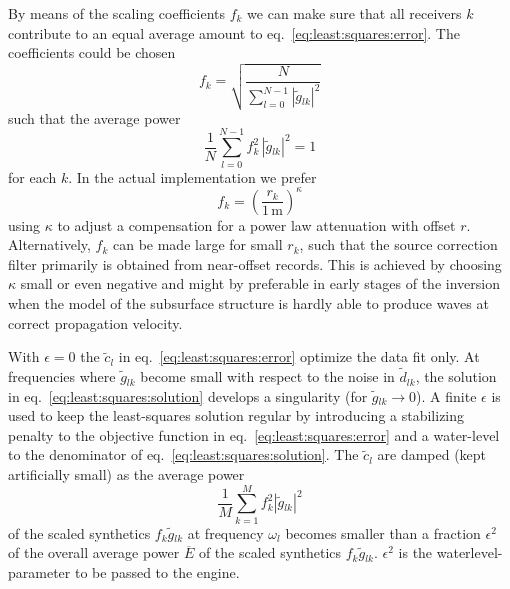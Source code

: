 \documentclass{article}
\newcommand{\Fourier}[1]{\ensuremath{\tilde{#1}}}
\newcommand{\Fd}{\ensuremath{\Fourier{d}}}
\newcommand{\Fs}{\ensuremath{\Fourier{g}}}
\newcommand{\Fq}{\ensuremath{\Fourier{c}}}
\newcommand{\So}{\ensuremath{\omega}}
\newcommand{\Sf}{\ensuremath{f}}
\newcommand{\Sr}{\ensuremath{r}}
\newcommand{\Ssk}{\ensuremath{\sum\limits_{k=1}^{M}}}
\newcommand{\SslN}{\ensuremath{\sum\limits_{l=0}^{N-1}}}
\newcommand{\Silk}{\ensuremath{_{lk}}}
\newcommand{\SmE}{\ensuremath{\overline{E}}}
\newcommand{\Se}{\ensuremath{\epsilon}}
\begin{document}
By means of the
scaling coefficients $\Sf_k$ we can make sure that all receivers
$k$ contribute to an equal average amount to
eq.~\eqref{eq:least:squares:error}.
The coefficients could be chosen
\begin{equation}
\Sf_k=\sqrt{\frac{N}{\SslN\left|\Fs\Silk\right|^2}}
\end{equation}
such that the average power
\begin{equation}
\frac{1}{N}\SslN\Sf^2_k\,\left|\Fs\Silk\right|^2=1
\end{equation}
for each $k$.
In the actual implementation we prefer
\begin{equation}
\Sf_k=\left(\frac{\Sr_k}{1\,\text{m}}\right)^\kappa
\end{equation}
using $\kappa$ to adjust a compensation for a power law attenuation with
offset $\Sr$.
Alternatively, $\Sf_k$ can be made large for small $\Sr_k$, such that the
source correction filter primarily is obtained from near-offset records.
This is achieved by choosing $\kappa$ small or even negative and
might by preferable in early stages of the inversion when the model of
the subsurface structure is hardly able to produce waves at correct
propagation velocity.

With $\Se=0$ the $\Fq_l$ in eq.~\eqref{eq:least:squares:error} optimize the
data fit only.
At frequencies where $\Fs\Silk$ become small with respect to the noise in 
$\Fd\Silk$, the solution in eq.~\eqref{eq:least:squares:solution} develops a
singularity (for $\Fs\Silk\rightarrow0$).
A finite $\Se$ is used to keep the least-squares solution regular
by introducing a stabilizing penalty to the objective function in
eq.~\eqref{eq:least:squares:error} and
a water-level to the denominator of eq.~\eqref{eq:least:squares:solution}.
The $\Fq_l$ are damped (kept artificially small) as the
average power 
\begin{equation}
\frac{1}{M}\Ssk\Sf_k^2\left|\Fs\Silk\right|^2
\end{equation}
of the scaled synthetics $\Sf_k\Fs\Silk$ at frequency $\So_l$ becomes smaller
than a fraction $\Se^2$ of the overall average power $\SmE$ of the scaled
synthetics $\Sf_k\Fs\Silk$.
$\Se^2$ is the waterlevel-parameter to be passed to the engine.
\end{document}
